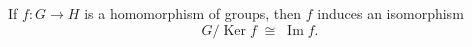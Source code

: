 If $f \colon G \to H$ is a homomorphism of groups, then $f$ induces an isomorphism
\[
G / \operatorname{Ker} f \;\cong\; \operatorname{Im} f.
\]
